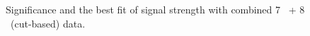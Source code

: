 \begin{figure}[!hbtp]
\centering
{}
\caption{Significance and the best fit of signal strength with combined 7 \TeV\ + 8 \TeV\ (cut-based) data.}
\label{fig:sig_mu_comb_7p8}
\end{figure}

